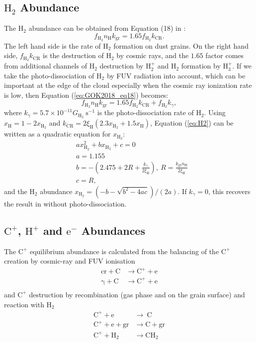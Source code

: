 \documentclass[iop,numberedappendix]{emulateapj}
\newcommand{\mr}{\mathrm}
\newcommand{\Ht}{\mathrm{H_2}}
\newcommand{\Ho}{\mathrm{H}}
\newcommand{\Hplus}{\mathrm{H^+}}
\newcommand{\Cplus}{\mathrm{C^+}}
\begin{document}
\subsection{$\Ht$ Abundance\label{section:H2}}
The $\Ht$ abundance can be obtained from Equation (18) in \citet{GOK2018}:
\begin{equation}\label{eq:GOK2018_eq18}
    f_\Ht n_\Ho k_\mr{gr} = 1.65 f_\Ht k_\mr{CR}.
\end{equation}
The left hand side is the rate of $\Ht$ formation on dust grains. On the right
hand side, $f_\Ht k_\mr{CR}$ is the destruction of $\Ht$ by cosmic rays, and
the $1.65$ factor comes from additional channels of $\Ht$ destruction by
$\mr{H_2^+}$ and $\Ht$ formation by $\mr{H_3^+}$. If we take the
photo-dissociation of $\Ht$ by FUV radiation into account, which can be
important at the edge of the cloud especially when the cosmic ray ionization
rate is low, then Equation (\ref{eq:GOK2018_eq18}) becomes:
\begin{equation}\label{eq:H2}
    f_\Ht n_\Ho k_\mr{gr} = 1.65 f_\Ht k_\mr{CR} + f_\Ht k_\gamma,
\end{equation}
where $k_\gamma=5.7\times 10^{-11}G_\Ht~\mr{s^{-1}}$ is the photo-dissociation
rate of $\Ht$. Using $x_\Ho = 1-2x_\Ht$ and
$k_\mr{CR}=2\xi_\Ho(2.3x_\Ht+1.5x_\Ho)$, Equation (\ref{eq:H2}) can be written
as a quadratic equation for $x_\Ht$:
\begin{align}
    &a x_\Ht^2 + bx_\Ht + c = 0\\
    &a = 1.155\\
    &b=- (2.475 + 2R + \frac{k_\gamma}{2\xi_\Ho}),
    ~R=\frac{k_\mr{gr}n_\Ho}{2\xi_\Ho}\\
    &c=R,
\end{align}
and the $\Ht$ abundance $x_\Ht=(-b - \sqrt{b^2 - 4ac} )/(2a)$. If $k_\gamma=0$,
this recovers the result in \citet{GOK2018} without photo-dissociation.

\subsection{$\Cplus$, $\Hplus$ and $\mr{e^{-}}$ Abundances\label{section:e}}
The $\Cplus$ equilibrium abundance is calculated from the balancing of the
$\Cplus$ creation by cosmic-ray and FUV ionisation
\begin{align*}
    \mr{cr + C }&\mr{\rightarrow C^+ + e}\\
    \mr{\gamma + C }&\mr{\rightarrow C^+ + e}\\
\end{align*}
and $\Cplus$ destruction by recombination (gas phase and on the grain surface)
and reaction with $\Ht$
\begin{align*}
    \mr{C^+ + e }&\mr{\rightarrow\ C}\\
    \mr{C^+ + e + gr }&\mr{\rightarrow C + gr}\\
    \mr{C^+ + H_2 }&\mr{\rightarrow CH_2}
\end{align*}
\end{document}
